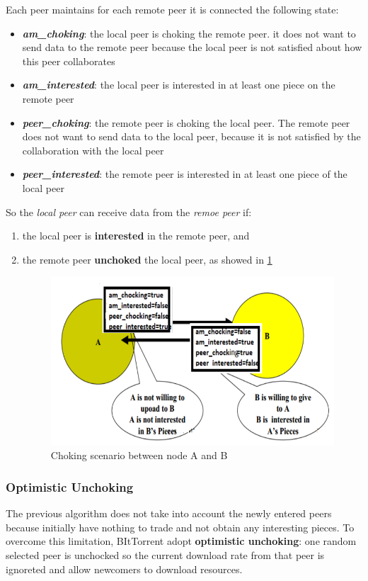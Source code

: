 \documentclass[10pt,a4paper]{report}
\begin{document}
Each peer maintains for each remote peer it is connected the following state:
\begin{itemize}
	\item 
	\textit{\textbf{am\_choking}}: the local peer is choking the remote peer. it does not want to send data to the remote peer because the local peer is not satisfied about how this peer collaborates
	\item 
	\textit{\textbf{am\_interested}}: the local peer is interested in at least one piece on the remote peer
	\item 
	\textit{\textbf{peer\_choking}}: the remote peer is choking the local peer.  The remote peer does not want to send data to the local peer, because it is not satisfied by the collaboration with the local peer
	\item 
	\textit{\textbf{peer\_interested}}: the remote peer is interested in at least one piece of the local peer
\end{itemize}

So the \textit{local peer} can receive data from the \textit{remoe peer} if:
\begin{enumerate}
	\item 
	the local peer is \textbf{interested} in the remote peer, and
	\item 
	the remote peer \textbf{unchoked} the local peer, as showed in \ref{chocked-scenario}
	\begin{figure}[h]
		\centering
		\includegraphics[scale=0.50]{images/Pasted image 20230311104352.png}
		\caption{Choking scenario between node A and B}
		\label{chocked-scenario}
	\end{figure}
	

\end{enumerate}
\subsubsection{Optimistic Unchoking}\label{sec:optimistic-unchoking}
The previous algorithm does not take into account the newly entered peers because initially have nothing to trade and not obtain any interesting pieces. To overcome this limitation, BItTorrent adopt \textbf{optimistic unchoking}: one random selected peer is unchocked so the current download rate from that peer is ignoreted and allow newcomers to download resources.
\end{document}
